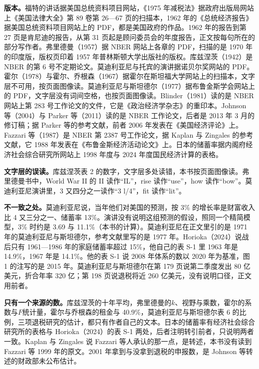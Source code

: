 \begin{deeper}[史料说明]
\textbf{版本。}福特的讲话据美国总统资料项目网站，《1975 年减税法》据政府出版局网站上《美国法律大全》第 89 卷第 26—67 页的扫描本，1962 年的《总统经济报告》据美国总统资料项目网站上的 PDF，都是美国政府的作品。1962 年的报告到第 27 页是肯尼迪的报告，从第 31 页起是顾问委员会的年度报告，正文按每句所在的部分写作者。弗里德曼（1957）据 NBER 网站上各章的 PDF，扫描的是 1970 年的印度版，版权页印着 1957 年普林斯顿大学出版社的版权。库兹涅茨（1942）是 NBER 的第 6 号不定期论文。莫迪利亚尼与托宾的演讲据诺贝尔奖网站的 PDF。霍尔（1978）与霍尔、乔根森（1967）据霍尔在斯坦福大学网站上的扫描本，文字层不可用，按页面图像读。莫迪利亚尼与斯坦德尔（1977）据布鲁金斯学会网站上的 PDF，文字层没有词间空格，也按页面图像读。Blinder（1981）读的是 NBER 网站上第 283 号工作论文的文件，它是《政治经济学杂志》的重印本。Johnson 等（2004）与 Parker 等（2011）读的是 NBER 工作论文，后者是 2013 年 3 月的修订稿；据 Parker 等的参考文献，前者 2006 年发表在《美国经济评论》上。Fazzari 等（1987）是 NBER 第 2387 号工作论文，据 Kaplan 与 Zingales 的参考文献，它 1988 年发表在《布鲁金斯经济活动论文》上。日本的储蓄率据内阁府经济社会综合研究所网站上 1998 年度与 2024 年度国民经济计算的表格。

\textbf{文字层的误读。}库兹涅茨表 2 的数字，文字层多处读错，本书按页面图像读。弗里德曼书中，World War II 的 II 读作“IL”，rise 读作“use”，how 读作“bow”。莫迪利亚尼演讲里，3 又四分之一读作“3 l/4”，fit 读作“lit”。

\textbf{不一致之处。}莫迪利亚尼说，当年他们对美国的预测，按 3\% 的增长率是财富收入比 4 又三分之一、储蓄率 13\%。演讲没有说明这组预测的假设，照同一个精简模型，3\% 时约是 3.69 与 11.1\%（本书的计算）。莫迪利亚尼在正文里引的是 1971 年的莫迪利亚尼与斯坦德尔，参考文献里写的是 1977 年。Horioka（2024）说战后只有 1961—1986 年的家庭储蓄率超过 15\%，他自己的表 S-1 里 1963 年是 14.9\%，1967 年是 14.1\%。他的表 S-1 说 2008 年体系的数以 2020 年为基准，图 1 的注写的是 2015 年。莫迪利亚尼与斯坦德尔在第 179 页说第二季度发出 80 亿美元，折合年率 320 亿；第 198 页说退税将近 260 亿美元，没有说明口径，正文用前者。

\textbf{只有一个来源的数。}库兹涅茨的十年平均，弗里德曼的$k$、视野与乘数，霍尔的系数与$F$统计量，霍尔与乔根森的租金与 40.9\%，莫迪利亚尼与斯坦德尔表 6 的比例，三项退税研究的估计，都只有作者自己的文本。日本的储蓄率有经济社会综合研究所的表格与 Horioka（2024）的表 S-1 两处，后者注明转引前者，只说明两者一致。Kaplan 与 Zingales 说 Fazzari 等人承认的那一点，是转述，本书没有读到 Fazzari 等 1999 年的原文。2001 年拿到与没拿到退税的申报数，是 Johnson 等转述的财政部未公布估计。


\end{deeper}
